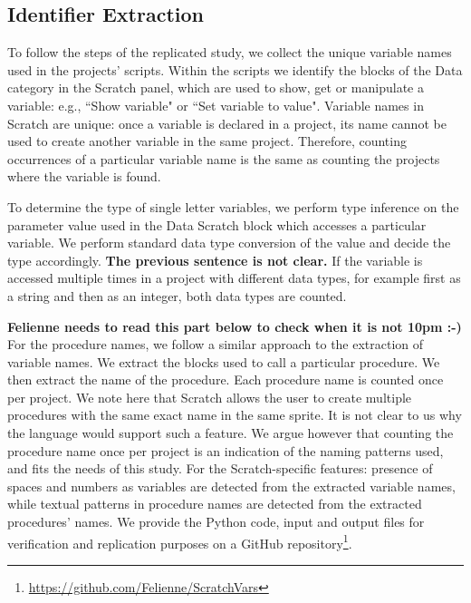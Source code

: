 \documentclass[conference]{IEEEtran}
\newcommand{\todo}[1]{ \textbf{#1} }
\begin{document}
\subsection{Identifier Extraction}
To follow the steps of the replicated study, we collect the unique variable names used in the projects' scripts. 
Within the scripts we identify the blocks of the Data category in the Scratch panel, which are used to show, get or manipulate a variable: e.g., ``Show variable" or ``Set variable to value". 
Variable names in Scratch are unique: once a variable is declared in a project, its name cannot be used to create another variable in the same project. %
Therefore, counting occurrences of a particular variable name is the same as counting the projects where the variable is found. 

To determine the type of single letter variables, we perform type inference on the parameter value used in the Data Scratch block which accesses a particular variable. 
We perform standard data type conversion of the value and decide the type accordingly. \todo{The previous sentence is not clear.}
If the variable is accessed multiple times in a project with different data types, for example first as a string and then as an integer, both data types are counted.

\todo{Felienne needs to read this part below to check when it is not 10pm :-)}
For the procedure names, we follow a similar approach to the extraction of variable names. 
We extract the blocks used to call a particular procedure. 
We then extract the name of the procedure. 
Each procedure name is counted once per project. 
We note here that Scratch allows the user to create multiple procedures with the same exact name in the same sprite. 
It is not clear to us why the language would support such a feature. 
We argue however that counting the procedure name once per project is an indication of the naming patterns used, and fits the needs of this study.  
For the Scratch-specific features: presence of spaces and numbers as variables are detected from the extracted variable names, while textual patterns in procedure names are detected from the extracted procedures' names.
We provide the Python code, input and output files for verification and replication purposes on a GitHub repository\footnote{\url{https://github.com/Felienne/ScratchVars}}.
\end{document}
